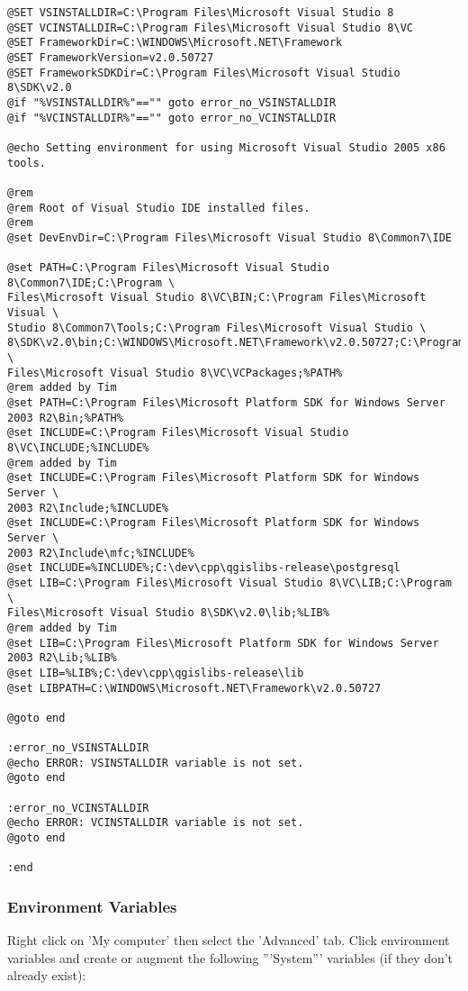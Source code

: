 \begin{verbatim}
@SET VSINSTALLDIR=C:\Program Files\Microsoft Visual Studio 8
@SET VCINSTALLDIR=C:\Program Files\Microsoft Visual Studio 8\VC
@SET FrameworkDir=C:\WINDOWS\Microsoft.NET\Framework
@SET FrameworkVersion=v2.0.50727
@SET FrameworkSDKDir=C:\Program Files\Microsoft Visual Studio 8\SDK\v2.0
@if "%VSINSTALLDIR%"=="" goto error_no_VSINSTALLDIR
@if "%VCINSTALLDIR%"=="" goto error_no_VCINSTALLDIR

@echo Setting environment for using Microsoft Visual Studio 2005 x86 tools.

@rem
@rem Root of Visual Studio IDE installed files.
@rem
@set DevEnvDir=C:\Program Files\Microsoft Visual Studio 8\Common7\IDE

@set PATH=C:\Program Files\Microsoft Visual Studio 8\Common7\IDE;C:\Program \
Files\Microsoft Visual Studio 8\VC\BIN;C:\Program Files\Microsoft Visual \
Studio 8\Common7\Tools;C:\Program Files\Microsoft Visual Studio \
8\SDK\v2.0\bin;C:\WINDOWS\Microsoft.NET\Framework\v2.0.50727;C:\Program \
Files\Microsoft Visual Studio 8\VC\VCPackages;%PATH%
@rem added by Tim
@set PATH=C:\Program Files\Microsoft Platform SDK for Windows Server 2003 R2\Bin;%PATH%
@set INCLUDE=C:\Program Files\Microsoft Visual Studio 8\VC\INCLUDE;%INCLUDE%
@rem added by Tim
@set INCLUDE=C:\Program Files\Microsoft Platform SDK for Windows Server \
2003 R2\Include;%INCLUDE%
@set INCLUDE=C:\Program Files\Microsoft Platform SDK for Windows Server \
2003 R2\Include\mfc;%INCLUDE%
@set INCLUDE=%INCLUDE%;C:\dev\cpp\qgislibs-release\postgresql
@set LIB=C:\Program Files\Microsoft Visual Studio 8\VC\LIB;C:\Program \
Files\Microsoft Visual Studio 8\SDK\v2.0\lib;%LIB%
@rem added by Tim
@set LIB=C:\Program Files\Microsoft Platform SDK for Windows Server 2003 R2\Lib;%LIB%
@set LIB=%LIB%;C:\dev\cpp\qgislibs-release\lib
@set LIBPATH=C:\WINDOWS\Microsoft.NET\Framework\v2.0.50727

@goto end

:error_no_VSINSTALLDIR
@echo ERROR: VSINSTALLDIR variable is not set. 
@goto end

:error_no_VCINSTALLDIR
@echo ERROR: VCINSTALLDIR variable is not set. 
@goto end

:end

\end{verbatim}

\subsubsection{Environment Variables}
Right click on 'My computer' then select the 'Advanced' tab. Click environment variables and 
create or augment the following '''System''' variables (if they don't already exist):

